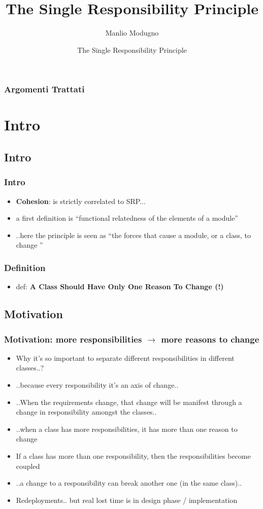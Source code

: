 \documentclass{beamer}
\title{The Single Responsibility Principle}
\author{Manlio Modugno}
\institute[GMTechnologies]
\date[]{The Single Responsibility Principle}
\begin{document}
\begin{frame}
  \titlepage
\end{frame}

\begin{frame}
  \frametitle{Argomenti Trattati}
  \tableofcontents
\end{frame}


\section{Intro}
\subsection{Intro}
\begin{frame}
  \frametitle{Intro}
  \begin{itemize}
	\item<+-> \textbf{Cohesion}: is strictly correlated to SRP...
	\item<+-> a first definition is ``functional relatedness of the elements of a module''
	\item<+-> ..here the principle is seen as ``the forces that cause a module, or a class, to change ''
   \end{itemize}
\end{frame}

\begin{frame}
  \frametitle{Definition}
  \begin{itemize}
	\item<+-> def: \textbf{A Class Should Have Only One Reason To Change (!)}
   \end{itemize}
\end{frame}

\subsection{Motivation}
\begin{frame}
  \frametitle{Motivation: more responsibilities $ \rightarrow $ more reasons to change}
  \begin{itemize}
	\item<+-> Why it's so important to separate different responsibilities in different classes..?
	\item<+-> ..because every responsibility it's an axis of change.. 
	\item<+-> ..When  the  requirements  change,  that change will be manifest through a change in responsibility amongst the classes..
	\item<+-> ..when a class has more responsibilities, it has more than one reason to change
	\item<+-> If a class has more than one responsibility, then the responsibilities become coupled
	\item<+-> ..a change to a responsibility can break another one (in the same class).. 
	\item<+-> Redeployments.. but real lost time is in design phase / implementation
   \end{itemize}
\end{frame}
\end{document}
